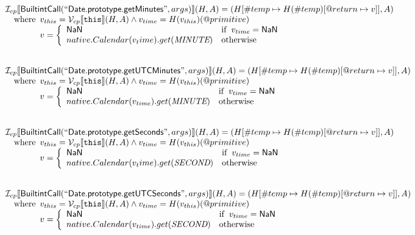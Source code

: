 \documentclass{article}
\newcommand{\SF}[1]{\mbox{\textsf{#1}}}
\newcommand{\TT}[1]{\mbox{\texttt{#1}}}
\newcommand{\wherec}[1]{{\rm where}\begin{array}[t]{l}#1\end{array}}
\newcommand{\ifc}[1]{{\rm if}\begin{array}[t]{l}#1\end{array}}
\newcommand{\owc}{{\rm otherwise}}
\newcommand{\I}{\mathcal{I}}
\newcommand{\V}{\mathcal{V}}
\newcommand{\lbr}{\llbracket}
\newcommand{\rbr}{\rrbracket}
\begin{document}
\[
\begin{array}{l}

\I _{cp}\lbr \SF{BuiltintCall}(``\SF{Date.prototype.getMinutes}",args)\rbr(H,A)
  = (H[\#temp \mapsto H(\#temp)[@return \mapsto v]], A)\\
\quad\wherec{
  v_{this} = \V _{cp}\lbr \TT{this}\rbr (H,A) \land v_{time} = H(v_{this})(@primitive)\\
  v = \left\{\begin{array}{ll}
    \SF{NaN}  & \ifc{v_{time} = \SF{NaN}}\\
    native.Calendar(v_time).get(\emph{MINUTE}) & \owc
    \end{array}\right.
  }\\
\\\\

\I _{cp}\lbr \SF{BuiltintCall}(``\SF{Date.prototype.getUTCMinutes}",args)\rbr(H,A)
  = (H[\#temp \mapsto H(\#temp)[@return \mapsto v]], A)\\
\quad\wherec{
  v_{this} = \V _{cp}\lbr \TT{this}\rbr (H,A) \land v_{time} = H(v_{this})(@primitive)\\
  v = \left\{\begin{array}{ll}
    \SF{NaN}  & \ifc{v_{time} = \SF{NaN}}\\
    native.Calendar(v_{time}).get(\emph{MINUTE}) & \owc
    \end{array}\right.
  }\\
\\\\

\I _{cp}\lbr \SF{BuiltintCall}(``\SF{Date.prototype.getSeconds}",args)\rbr(H,A)
  = (H[\#temp \mapsto H(\#temp)[@return \mapsto v]], A)\\
\quad\wherec{
  v_{this} = \V _{cp}\lbr \TT{this}\rbr (H,A) \land v_{time} = H(v_{this})(@primitive)\\
  v = \left\{\begin{array}{ll}
    \SF{NaN}  & \ifc{v_{time} = \SF{NaN}}\\
    native.Calendar(v_time).get(\emph{SECOND}) & \owc
    \end{array}\right.
  }\\
\\\\

\I _{cp}\lbr \SF{BuiltintCall}(``\SF{Date.prototype.getUTCSeconds}",args)\rbr(H,A)
  = (H[\#temp \mapsto H(\#temp)[@return \mapsto v]], A)\\
\quad\wherec{
  v_{this} = \V _{cp}\lbr \TT{this}\rbr (H,A) \land v_{time} = H(v_{this})(@primitive)\\
  v = \left\{\begin{array}{ll}
    \SF{NaN}  & \ifc{v_{time} = \SF{NaN}}\\
    native.Calendar(v_{time}).get(\emph{SECOND}) & \owc
    \end{array}\right.
  }\\
\\\\


\end{array}\]
\end{document}
